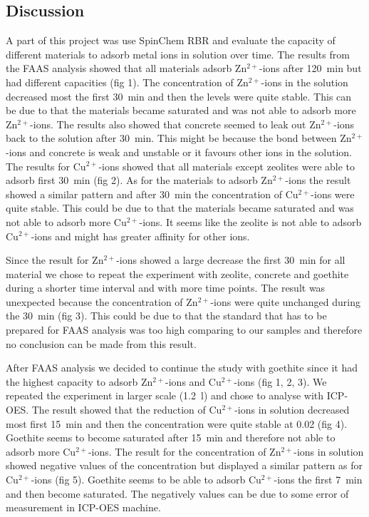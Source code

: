 \subsection{Discussion}
A part of this project was use SpinChem RBR and evaluate the
capacity of different materials to adsorb metal ions in solution over time. The
results from the FAAS analysis showed that all materials adsorb Zn$^{2+}$-ions after
120~min but had different capacities (fig 1). The concentration of Zn$^{2+}$-ions in
the solution decreased most the first 30~min and then the levels were quite
stable. This can be due to that the materials became saturated and was not able
to adsorb more Zn$^{2+}$-ions. The results also showed that concrete seemed to leak
out Zn$^{2+}$-ions back to the solution after 30~min. This might be because the bond
between Zn$^{2+}$-ions and concrete is weak and unstable or it favours other ions in
the solution. The results for Cu$^{2+}$-ions showed that all materials except
zeolites were able to adsorb first 30~min (fig 2). As for the materials to
adsorb Zn$^{2+}$-ions the result showed a similar pattern and after 30~min the
concentration of Cu$^{2+}$-ions were quite stable. This could be due to that the
materials became saturated and was not able to adsorb more Cu$^{2+}$-ions. It seems
like the zeolite is not able to adsorb Cu$^{2+}$-ions and might has greater affinity
for other ions.

Since the result for Zn$^{2+}$-ions showed a large decrease the first 30~min for all
material we chose to repeat the experiment with zeolite, concrete and goethite
during a shorter time interval and with more time points. The result was
unexpected because the concentration of Zn$^{2+}$-ions were quite unchanged during
the 30~min (fig 3). This could be due to that the standard that has to be
prepared for FAAS analysis was too high comparing to our samples and therefore
no conclusion can be made from this result.

After FAAS analysis we decided to continue the study with goethite since it had
the highest capacity to adsorb Zn$^{2+}$-ions and Cu$^{2+}$-ions (fig 1, 2, 3). We
repeated the experiment in larger scale (1.2~l) and chose to analyse with
ICP-OES. The result showed that the reduction of Cu$^{2+}$-ions in solution
decreased most first 15~min and then the concentration were quite stable at
0.02 (fig 4). Goethite seems to become saturated after 15~min and therefore not
able to adsorb more Cu$^{2+}$-ions. The result for the concentration of Zn$^{2+}$-ions in
solution showed negative values of the concentration but displayed a similar
pattern as for Cu$^{2+}$-ions (fig 5). Goethite seems to be able to adsorb Cu$^{2+}$-ions
the first 7~min and then become saturated. The negatively values can be due to
some error of measurement in ICP-OES machine.

